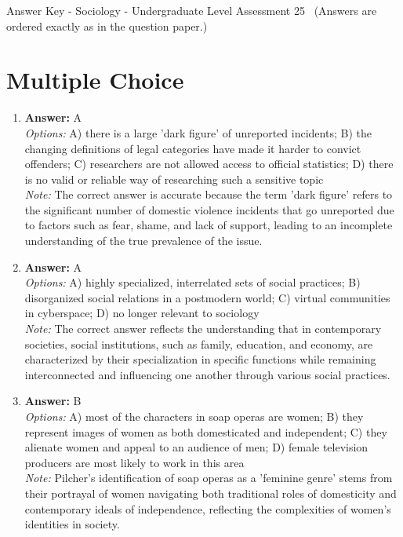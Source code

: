 \documentclass[12pt]{article}
\begin{document}
\begin{center}
Answer Key - Sociology - Undergraduate Level Assessment 25 \
\small (Answers are ordered exactly as in the question paper.)
\end{center}

\section*{Multiple Choice}
\begin{enumerate}[label=\arabic*.]
\item \textbf{Answer:} A
\\ \textit{Options:} A) there is a large 'dark figure' of unreported incidents; B) the changing definitions of legal categories have made it harder to convict offenders; C) researchers are not allowed access to official statistics; D) there is no valid or reliable way of researching such a sensitive topic
\\ \textit{Note:} The correct answer is accurate because the term 'dark figure' refers to the significant number of domestic violence incidents that go unreported due to factors such as fear, shame, and lack of support, leading to an incomplete understanding of the true prevalence of the issue.
\item \textbf{Answer:} A
\\ \textit{Options:} A) highly specialized, interrelated sets of social practices; B) disorganized social relations in a postmodern world; C) virtual communities in cyberspace; D) no longer relevant to sociology
\\ \textit{Note:} The correct answer reflects the understanding that in contemporary societies, social institutions, such as family, education, and economy, are characterized by their specialization in specific functions while remaining interconnected and influencing one another through various social practices.
\item \textbf{Answer:} B
\\ \textit{Options:} A) most of the characters in soap operas are women; B) they represent images of women as both domesticated and independent; C) they alienate women and appeal to an audience of men; D) female television producers are most likely to work in this area
\\ \textit{Note:} Pilcher's identification of soap operas as a 'feminine genre' stems from their portrayal of women navigating both traditional roles of domesticity and contemporary ideals of independence, reflecting the complexities of women's identities in society.

\end{enumerate}
\end{document}
